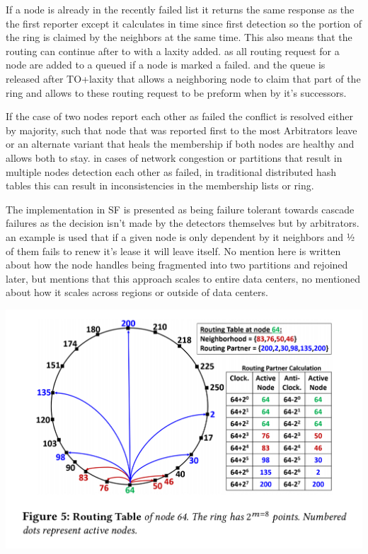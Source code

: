 \documentclass[a4paper,10pt,titlepage]{report}
\begin{document}
    If a node is already in the recently failed list it returns the same response as the the first reporter except it calculates in time since first detection so the portion of the ring is claimed by the neighbors at the same time. This also means that the routing can continue after to with a laxity added. as all routing request for a node are added to a queued if a node is marked a failed. and the queue is released after TO+laxity that allows a neighboring node to claim that part of the ring and allows to these routing request to be preform when by it's successors.\\
    \vspace{5mm}

    If the case of two nodes report each other as failed the conflict is resolved either by majority, such that node that was reported first to the most Arbitrators leave or an alternate variant that heals the membership if both nodes are healthy and allows both to stay. in cases of network congestion or partitions that result in multiple nodes detection each other as failed, in traditional distributed hash tables this can result in inconsistencies in the membership lists or ring. \\
    \vspace{5mm}

    The implementation in SF is presented as being failure tolerant towards cascade failures as the decision isn't made by the detectors themselves but by arbitrators. an example is used that if a given node is only dependent by it neighbors and ½ of them fails to renew it's lease it will leave itself. No mention here is written about how the node handles being fragmented into two partitions and rejoined later, but mentions that this approach scales to entire data centers, no mentioned about how it scales across regions or outside of data centers.\\
    \vspace{5mm}

    \includegraphics[scale=0.3]{images/servicefabric-fig-ring-topology.jpeg}
\end{document}
